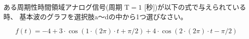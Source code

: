 ある周期性時間領域アナログ信号(周期 $\textrm{T} = 1$ [秒])が以下の式で与えられている時、
基本波のグラフを選択肢a〜dの中から1つ選びなさい。

\[
f(t) = 
-4
+ 3 \cdot \cos( 1 \cdot ( 2 \pi ) \cdot t + \pi/2  )
+ 4 \cdot \cos( 2 \cdot ( 2 \pi ) \cdot t - \pi/2 )
\]

